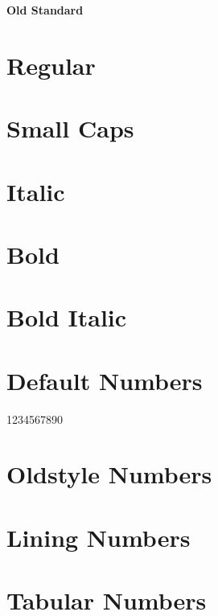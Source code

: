 \documentclass{article}
\begin{document}
\thispagestyle{empty}

\begin{center}\huge\bf Old Standard
\end{center}


\section*{Regular}
\lipsum[1]

\section*{Small Caps}
\textsc{\lipsum[1]}

\section*{Italic}
\textit{\lipsum[2]}

\section*{Bold}

\textbf{\lipsum[3]}

\section*{Bold Italic}


\textbf{\textit{\lipsum[4]}}

\section*{Default Numbers}

1234567890

\section*{Oldstyle Numbers}


\section*{Lining Numbers}


\section*{Tabular Numbers}
\end{document}
